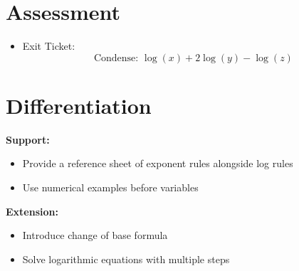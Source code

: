 \documentclass[10pt]{article}
\begin{document}
\section*{Assessment}

\begin{itemize}
    \item Exit Ticket:
    \[
    \text{Condense: } \log(x) + 2\log(y) - \log(z)
    \]
\end{itemize}

\section*{Differentiation}

\textbf{Support:}
\begin{itemize}
    \item Provide a reference sheet of exponent rules alongside log rules
    \item Use numerical examples before variables
\end{itemize}

\textbf{Extension:}
\begin{itemize}
    \item Introduce change of base formula
    \item Solve logarithmic equations with multiple steps
\end{itemize}
\end{document}
